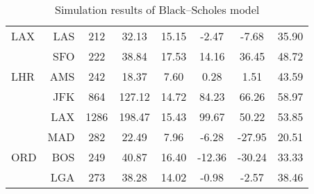 \begin{table}[h]
\begin{center}
\begin{tabular}{l r c c c c c c}
LAX  &  LAS  &     212  &   32.13  &  15.15  &   -2.47  &   -7.68  &   35.90 \\
~    &  SFO  &     222  &   38.84  &  17.53  &   14.16  &   36.45  &   48.72 \\[.5ex]
LHR  &  AMS  &     242  &   18.37  &   7.60  &    0.28  &    1.51  &   43.59 \\
~    &  JFK  &     864  &  127.12  &  14.72  &   84.23  &   66.26  &   58.97 \\
~    &  LAX  &    1286  &  198.47  &  15.43  &   99.67  &   50.22  &   53.85 \\
~    &  MAD  &     282  &   22.49  &   7.96  &   -6.28  &  -27.95  &   20.51 \\[.5ex]
ORD  &  BOS  &     249  &   40.87  &  16.40  &  -12.36  &  -30.24  &   33.33 \\
~    &  LGA  &     273  &   38.28  &  14.02  &   -0.98  &   -2.57  &   38.46 \\
            \bottomrule
        \end{tabular}
        \caption{Simulation results of Black--Scholes model}
        \label{tbl:resultsBS}
    \end{center}
\end{table}

